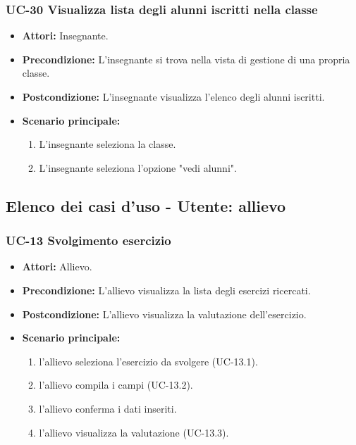 \subsubsection{UC-30 Visualizza lista degli alunni iscritti nella classe}		
\begin{itemize}
	\item \textbf{Attori:} Insegnante.
	\item \textbf{Precondizione:} L'insegnante si trova nella vista di gestione di una propria classe.
	\item \textbf{Postcondizione:} L'insegnante visualizza l'elenco degli alunni iscritti.
	\item \textbf{Scenario principale:}
	\begin{enumerate}
		\item L'insegnante seleziona la classe.
		\item L'insegnante seleziona l'opzione "vedi alunni".
	\end{enumerate}		
\end{itemize}


\subsection{Elenco dei casi d'uso - Utente: allievo}	
	\subsubsection{UC-13 Svolgimento esercizio}
	\begin{itemize}
	\item \textbf{Attori:} Allievo.
			\item \textbf{Precondizione:}  L'allievo visualizza la lista degli esercizi ricercati.
			\item \textbf{Postcondizione:} L'allievo visualizza la valutazione dell'esercizio.
			\item \textbf{Scenario principale:}
			\begin{enumerate}
				\item l'allievo seleziona l'esercizio da svolgere (UC-13.1).
				\item l'allievo compila i campi (UC-13.2).
				\item l'allievo conferma i dati inseriti.
				\item l'allievo visualizza la valutazione (UC-13.3).
			\end{enumerate}
	\end{itemize}
			
